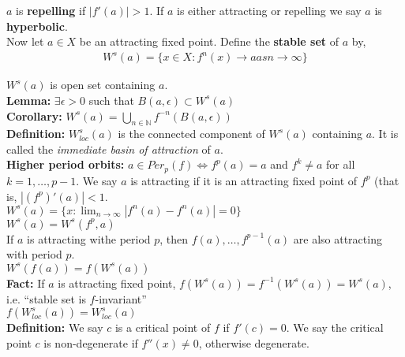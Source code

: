 \documentclass[12pt]{article}
\begin{document}
$a$ is \textbf{repelling} if $|f'(a)| > 1$. If $a$ is either attracting or repelling we say $a$ is \textbf{hyperbolic}.\\

Now let $a \in X$ be an attracting fixed point. Define the \textbf{stable set} of $a$ by,
\begin{align*}
W^s(a) = \{x \in X: f^n(x) \to a as n \to \infty\}
\end{align*}

 $W^s(a)$ is open set containing $a$.\\

\textbf{Lemma:} $\exists \epsilon > 0$ such that $B(a, \epsilon) \subset W^s(a)$\\

\textbf{Corollary:} $W^s(a) = \bigcup_{n \in \mathbb{N}} f^{-n}(B(a, \epsilon))$\\

\textbf{Definition:} $W^s_{loc}(a)$ is the connected component of $W^s(a)$ containing $a$. It is called the \textit{immediate basin of attraction} of $a$.\\

\textbf{Higher period orbits:} $a \in Per_p(f) \iff f^p(a) = a$ and $f^k \neq a$ for all $k = 1, \ldots, p-1$. We say $a$ is attracting if it is an attracting fixed point of $f^p$ (that is, $|(f^p)'(a)| < 1$.\\

$W^s(a) = \{x: \lim_{n \to \infty} |f^n(a) - f^n(a)| = 0\}$\\

$W^s(a) = W^s(f^p, a)$\\

If $a$ is attracting withe period $p$, then $f(a), \ldots, f^{p-1}(a)$ are also attracting with period $p$.\\

$W^s(f(a)) = f(W^s(a))$\\

\textbf{Fact:} If $a$ is attracting fixed point, $f(W^s(a)) = f^{-1}(W^s(a)) = W^s(a)$, i.e. ``stable set is $f$-invariant''\\

$f(W^s_{loc}(a)) = W^s_{loc}(a)$\\

\textbf{Definition:} We say $c$ is a critical point of $f$ if $f'(c) = 0$. We say the critical point $c$ is non-degenerate if $f''(x) \neq 0$, otherwise degenerate.\\
\end{document}
